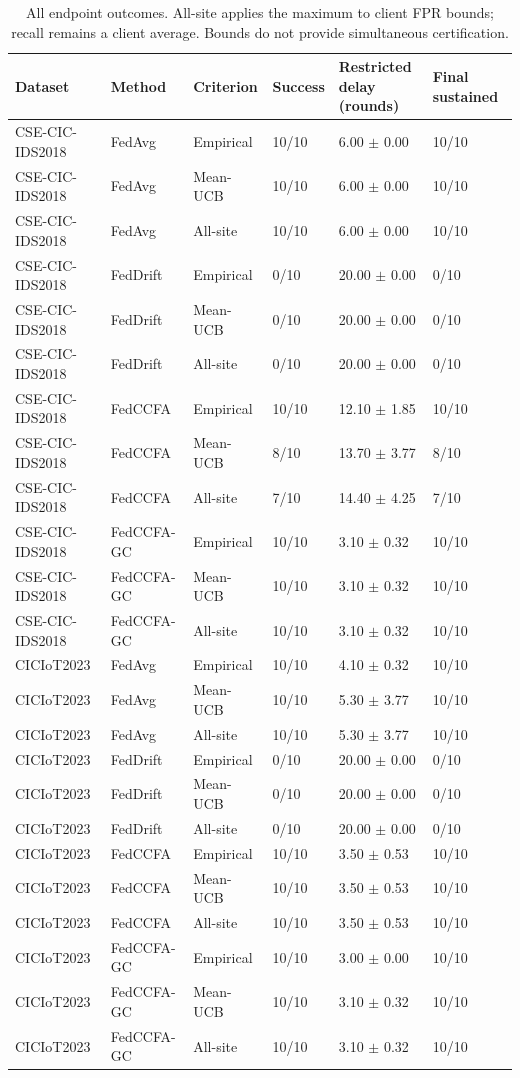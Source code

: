 \begin{table}[t]
\centering
\small
\setlength{\tabcolsep}{3pt}
\caption{All endpoint outcomes. All-site applies the maximum to client FPR bounds; recall remains a client average. Bounds do not provide simultaneous certification.}
\label{tab:all_endpoint_outcomes}
\begin{tabular}{llllll}
\hline
Dataset & Method & Criterion & Success & \shortstack{Restricted delay\\(rounds)} & Final sustained \\
\hline
CSE-CIC-IDS2018 & FedAvg & Empirical & 10/10 & 6.00 $\pm$ 0.00 & 10/10 \\
CSE-CIC-IDS2018 & FedAvg & Mean-UCB & 10/10 & 6.00 $\pm$ 0.00 & 10/10 \\
CSE-CIC-IDS2018 & FedAvg & All-site & 10/10 & 6.00 $\pm$ 0.00 & 10/10 \\
CSE-CIC-IDS2018 & FedDrift & Empirical & 0/10 & 20.00 $\pm$ 0.00 & 0/10 \\
CSE-CIC-IDS2018 & FedDrift & Mean-UCB & 0/10 & 20.00 $\pm$ 0.00 & 0/10 \\
CSE-CIC-IDS2018 & FedDrift & All-site & 0/10 & 20.00 $\pm$ 0.00 & 0/10 \\
CSE-CIC-IDS2018 & FedCCFA & Empirical & 10/10 & 12.10 $\pm$ 1.85 & 10/10 \\
CSE-CIC-IDS2018 & FedCCFA & Mean-UCB & 8/10 & 13.70 $\pm$ 3.77 & 8/10 \\
CSE-CIC-IDS2018 & FedCCFA & All-site & 7/10 & 14.40 $\pm$ 4.25 & 7/10 \\
CSE-CIC-IDS2018 & FedCCFA-GC & Empirical & 10/10 & 3.10 $\pm$ 0.32 & 10/10 \\
CSE-CIC-IDS2018 & FedCCFA-GC & Mean-UCB & 10/10 & 3.10 $\pm$ 0.32 & 10/10 \\
CSE-CIC-IDS2018 & FedCCFA-GC & All-site & 10/10 & 3.10 $\pm$ 0.32 & 10/10 \\
CICIoT2023 & FedAvg & Empirical & 10/10 & 4.10 $\pm$ 0.32 & 10/10 \\
CICIoT2023 & FedAvg & Mean-UCB & 10/10 & 5.30 $\pm$ 3.77 & 10/10 \\
CICIoT2023 & FedAvg & All-site & 10/10 & 5.30 $\pm$ 3.77 & 10/10 \\
CICIoT2023 & FedDrift & Empirical & 0/10 & 20.00 $\pm$ 0.00 & 0/10 \\
CICIoT2023 & FedDrift & Mean-UCB & 0/10 & 20.00 $\pm$ 0.00 & 0/10 \\
CICIoT2023 & FedDrift & All-site & 0/10 & 20.00 $\pm$ 0.00 & 0/10 \\
CICIoT2023 & FedCCFA & Empirical & 10/10 & 3.50 $\pm$ 0.53 & 10/10 \\
CICIoT2023 & FedCCFA & Mean-UCB & 10/10 & 3.50 $\pm$ 0.53 & 10/10 \\
CICIoT2023 & FedCCFA & All-site & 10/10 & 3.50 $\pm$ 0.53 & 10/10 \\
CICIoT2023 & FedCCFA-GC & Empirical & 10/10 & 3.00 $\pm$ 0.00 & 10/10 \\
CICIoT2023 & FedCCFA-GC & Mean-UCB & 10/10 & 3.10 $\pm$ 0.32 & 10/10 \\
CICIoT2023 & FedCCFA-GC & All-site & 10/10 & 3.10 $\pm$ 0.32 & 10/10 \\
\hline
\end{tabular}
\end{table}
